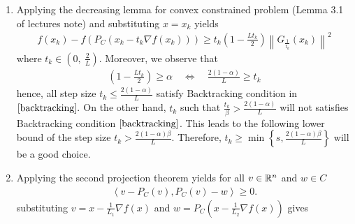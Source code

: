 \documentclass{ExerciseSheet}
\begin{document}
\begin{solution}%
  \begin{enumerate}
      \item Applying the decreasing lemma for convex constrained problem (Lemma 3.1 of lectures note) and substituting $x=x_k$ yields
    \begin{align*}
                f(x_k) - f\left(P_C(x_k -t_k\nabla f(x_k))\right) \geq t_k\left(1-\frac{Lt_k}{2}\right)\left\| G_{\frac{1}{t_k}}(x_k)\right\|^2
            \end{align*}
  where $t_k\in(0,~\frac{2}{L}).$ Moreover, we observe that
    \begin{align*}
        \left(1-\frac{Lt_k}{2}\right)\geq \alpha \quad \Leftrightarrow \quad \frac{2(1-\alpha)}{L}\geq t_k
    \end{align*}
hence, all step size $t_k\leq \frac{2(1-\alpha)}{L}$ satisfy Backtracking condition in $\eqref{backtracking}.$ On the other hand,  $t_k$ such that $\frac{t_k}{\beta}> \frac{2(1-\alpha)}{L}$ will not satisfies Backtracking condition $\eqref{backtracking}$. This leads to the following  lower bound of the step size $t_k> \frac{2(1-\alpha)\beta}{L}$. Therefore, $t_k\geq \min\left\{s,\frac{2(1-\alpha)\beta}{L} \right\}$
 will be a good choice.

    \item Applying the second projection theorem yields for all $v\in \mathbb{R}^n$ and $w\in C$
        \begin{align*}
            \left<v - P_C(v) , P_C(v) - w \right> \geq 0.
        \end{align*}
substituting $v=x-\frac{1}{L_1}\nabla f(x)$ and $w= P_C\left( x - \frac{1}{L_2}\nabla f(x) \right)$ gives
 

\end{enumerate}
\end{solution}
\end{document}

